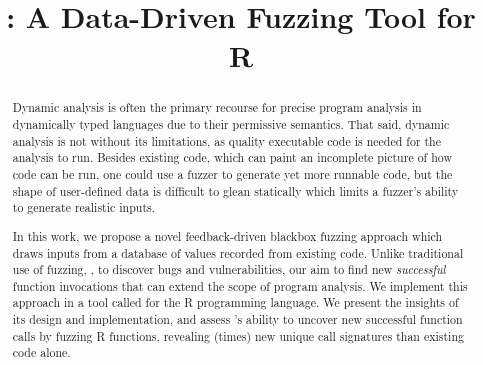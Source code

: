 \documentclass[sigplan,anonymous,review]{acmart}
\begin{document}
\title{\tool: A Data-Driven Fuzzing Tool for R}

\begin{abstract}

Dynamic analysis is often the primary recourse for precise program analysis in dynamically typed languages due to their permissive semantics. 
That said, dynamic analysis is not without its limitations, as quality executable code is needed for the analysis to run.
Besides existing code, which can paint an incomplete picture of how code can be run, one could use a fuzzer to generate yet more runnable code, but the shape of user-defined data is difficult to glean statically which limits a fuzzer's ability to generate realistic inputs.


In this work, we propose a novel feedback-driven blackbox fuzzing approach which draws inputs from a database of values recorded from existing code.
Unlike traditional use of fuzzing, \Ie, to discover bugs and vulnerabilities, our aim to find new \textit{successful} function invocations that can extend the scope of program analysis.
We implement this approach in a tool called \tool for the R programming language.
We present the insights of its design and implementation, and assess \tool's ability to uncover new successful function calls by fuzzing \UFNumFunctions R functions, revealing \UFSignatrSignatures (\UFSignatrBaselineSignaturesRatio times) new unique call signatures than existing code alone.


%
%




\end{abstract}
\end{document}
